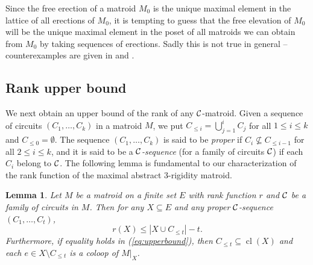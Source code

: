 \documentclass{daj}
\newtheorem{lemma}[thm]{Lemma}\theoremstyle{plain}
\DeclareMathOperator{\cl}{cl}
\newcommand{\sm}{{\setminus}}
\begin{document}
Since the free erection of a matroid $M_0$ is the unique maximal element in the lattice of all erections of $M_0$, it is tempting to guess that the free elevation of $M_0$ will be the unique maximal  element in the poset of all matroids we can obtain from $M_0$ by taking sequences of erections.
Sadly
this is not true in general -- counterexamples are given in \cite[Figure 7.9]{B86} and \cite[Theorem 5.4]{JT}.

\subsection{Rank upper bound}
We next obtain an upper bound of the rank of any ${\cal C}$-matroid.
Given a sequence of circuits  $(C_1,\dots, C_k)$ in a matroid $M$, we put
$C_{\leq i}=\bigcup_{j=1}^{i} C_j$ for all $1\leq i\leq k$ and  $C_{\leq 0}=\emptyset$.
The sequence $(C_1,\dots, C_k)$ is said to be {\em proper} if $C_i\not\subseteq C_{\leq i-1}$ for all $2\leq i\leq k$, and it is said to be a {\em ${\cal C}$-sequence} (for a family  of circuits ${\cal C}$) if each $C_i$ belong to ${\cal C}$.
The following lemma is fundamental to our characterization of the rank function of the maximal abstract 3-rigidity matroid.
\begin{lemma}
\label{lem:rank1}
Let $M$ be a matroid
on a finite set $E$ with rank function $r$
and ${\cal C}$ be a family of circuits in $M$.
Then for any $X\subseteq E$ and any proper ${\cal C}$-sequence $(C_1,\dots, C_t)$,
\begin{equation}\label{eq:upperbound}
r(X)\leq |X\cup C_{\leq t}|-t.
\end{equation}
Furthermore, if equality holds in {\rm (\ref{eq:upperbound})}, then $C_{\leq t}\subseteq \cl(X)$ and each $e\in X\sm C_{\leq t}$ is a coloop of $M|_X$.
\end{lemma}
\end{document}
